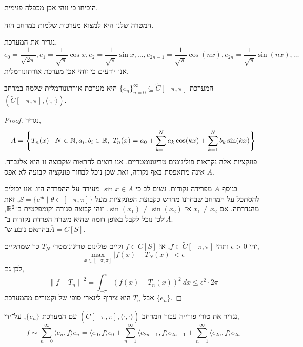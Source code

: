 \begin{exercise}
	הוכיחו כי זוהי אכן מכפלה פנימית.
\end{exercise}
המטרה שלנו היא למצוא מערכות שלמות במרחב הזה.
\begin{definition}
	נגדיר את המערכת,
	\[
		e_0 = \frac{1}{\sqrt{2 \pi}},
		e_1 = \frac{1}{\sqrt{\pi}} \cos x,
		e_2 = \frac{1}{\sqrt{\pi}} \sin x,
		\ldots,
		e_{2n - 1} = \frac{1}{\sqrt{\pi}} \cos(nx),
		e_{2n} = \frac{1}{\sqrt{\pi}} \sin(nx),
		\ldots
	\]
	אנו יודעים כי זוהי אכן מערכת אורתונורמלית.
\end{definition}
\begin{theorem}
	המערכת ${\{ e_n \}}_{n = 0}^\infty \subseteq \tilde{C}[-\pi, \pi]$ היא מערכת אורתונורמלית שלמה במרחב $(\tilde{C}[-\pi, \pi], \langle \cdot, \cdot \rangle)$.
\end{theorem}
\begin{proof}
	נגדיר,
	\[
		A
		= \left\{ T_n(x) \mid N \in \mathbb{N}, a_i, b_i \in \mathbb{R},\ T_n(x) = a_0 + \sum_{k = 1}^N a_k \cos(kx) + \sum_{k = 1}^N b_k \sin(kx) \right\}
	\]
	פונקציות אלה נקראות פולינומים טריגונומטריים.
	אנו רוצים להראות שקבוצה זו היא אלגברה.
	$A$ אינה מתאפסת באף נקודה, זאת שכן נוכל לבחור פונקציה קבועה לא אפס.

	בנוסף $A$ מפרידה נקודות.
	נשים לב כי $\sin x \in A$ מעידה על ההפרדה הזו.
	אנו יכולים להסתכל על המרחב שבחרנו מחדש כקבוצת הפונקציות מעל $S = \{ e^{i \theta} \mid \theta \in [-\pi, \pi] \}$, זאת מהגדרתה.
	אם $x_1 \ne x_2$ אז $\sin(x_1) \ne \sin(x_2)$.
	זוהי קבוצה סגורה וקומפקטית ב־$\mathbb{R}^2$, ולכן נוכל לקבל באופן דומה שהיא משרה הפרדת נקודות ב־$A$. \\
	בהתאם נובע ש־$\overline{A} = C[S]$.

	יהי $\epsilon > 0$ ותהי $f \in \tilde{C}[-\pi, \pi]$, אז $f \in C[S]$ וקיים פולינום טריגונומטרי $T_N$ כך שמתקיים,
	\[
		\max_{x \in [-\pi, \pi]} |f(x) - T_N(x)| < \epsilon
	\]
	לכן גם,
	\[
		{\lVert f - T_n \rVert}^2
		= \int_{-\pi}^{\pi} {(f(x) - T_n(x))}^2\ dx
		\le \epsilon^2 \cdot 2 \pi
	\]
	אבל $T_n$ היא צירוף לינארי סופי של וקטורים מהמערכת $\{ e_n \}$.
\end{proof}
\begin{definition}
	נגדיר את טורי פורייה עבור המרחב $(\tilde{C}[-\pi, \pi], \langle \cdot, \cdot \rangle)$ עם המערכת ${\{ e_n \}}$, על־ידי,
	\[
		f
		\sim \sum_{n = 0}^\infty \langle e_n, f \rangle e_n
		= \langle e_0, f \rangle e_0 + \sum_{n = 1}^\infty \langle e_{2n - 1}, f \rangle e_{2n - 1} + \sum_{n = 1}^\infty \langle e_{2n}, f \rangle e_{2n}
	\]
\end{definition}
